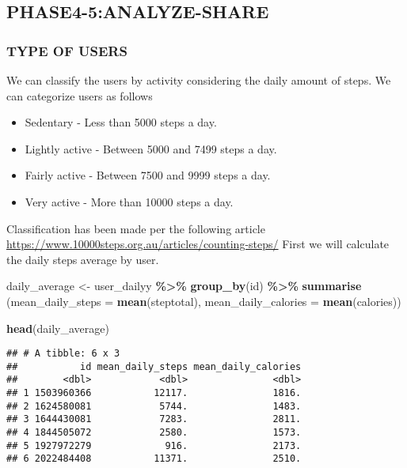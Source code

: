 \documentclass[
]{article}
\newenvironment{Shaded}{\begin{snugshade}}{\end{snugshade}}
\newcommand{\AttributeTok}[1]{\textcolor[rgb]{0.13,0.29,0.53}{#1}}
\newcommand{\FunctionTok}[1]{\textcolor[rgb]{0.13,0.29,0.53}{\textbf{#1}}}
\newcommand{\NormalTok}[1]{#1}
\newcommand{\OtherTok}[1]{\textcolor[rgb]{0.56,0.35,0.01}{#1}}
\newcommand{\SpecialCharTok}[1]{\textcolor[rgb]{0.81,0.36,0.00}{\textbf{#1}}}
\providecommand{\tightlist}{%
  \setlength{\itemsep}{0pt}\setlength{\parskip}{0pt}}
\begin{document}
\hypertarget{phase4-5analyze-share}{%
\subsection{PHASE4-5:ANALYZE-SHARE}\label{phase4-5analyze-share}}

\hypertarget{type-of-users}{%
\subsubsection{TYPE OF USERS}\label{type-of-users}}

We can classify the users by activity considering the daily amount of
steps. We can categorize users as follows

\begin{itemize}
\tightlist
\item
  Sedentary - Less than 5000 steps a day.
\item
  Lightly active - Between 5000 and 7499 steps a day.
\item
  Fairly active - Between 7500 and 9999 steps a day.
\item
  Very active - More than 10000 steps a day.
\end{itemize}

Classification has been made per the following article
\href{URL}{https://www.10000steps.org.au/articles/counting-steps/} First
we will calculate the daily steps average by user.

\begin{Shaded}
\begin{Highlighting}[]
\NormalTok{daily\_average }\OtherTok{\textless{}{-}}\NormalTok{ user\_dailyy }\SpecialCharTok{\%\textgreater{}\%}
  \FunctionTok{group\_by}\NormalTok{(id) }\SpecialCharTok{\%\textgreater{}\%}
  \FunctionTok{summarise}\NormalTok{ (}\AttributeTok{mean\_daily\_steps =} \FunctionTok{mean}\NormalTok{(steptotal), }\AttributeTok{mean\_daily\_calories =} \FunctionTok{mean}\NormalTok{(calories))}

\FunctionTok{head}\NormalTok{(daily\_average)}
\end{Highlighting}
\end{Shaded}

\begin{verbatim}
## # A tibble: 6 x 3
##           id mean_daily_steps mean_daily_calories
##        <dbl>            <dbl>               <dbl>
## 1 1503960366           12117.               1816.
## 2 1624580081            5744.               1483.
## 3 1644430081            7283.               2811.
## 4 1844505072            2580.               1573.
## 5 1927972279             916.               2173.
## 6 2022484408           11371.               2510.
\end{verbatim}
\end{document}
